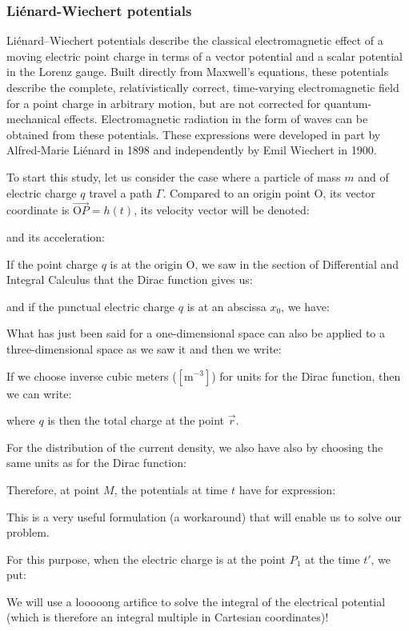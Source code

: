 	\subsubsection{Liénard-Wiechert potentials}\label{linear wiechard potentials}
	Liénard–Wiechert potentials describe the classical electromagnetic effect of a moving electric point charge in terms of a vector potential and a scalar potential in the Lorenz gauge. Built directly from Maxwell's equations, these potentials describe the complete, relativistically correct, time-varying electromagnetic field for a point charge in arbitrary motion, but are not corrected for quantum-mechanical effects. Electromagnetic radiation in the form of waves can be obtained from these potentials. These expressions were developed in part by Alfred-Marie Liénard in 1898 and independently by Emil Wiechert in 1900.
	
	To start this study, let us consider the case where a particle of mass $m$ and of electric charge $q$ travel a path $\Gamma$. Compared to an origin point O, its vector coordinate is $\overrightarrow{\text{O}P}=h(t)$, its velocity vector will be denoted:
	
	and its acceleration:
	
	If the point charge $q$ is at the origin O, we saw in the section of Differential and Integral Calculus that the Dirac function gives us:
	
	and if the punctual electric charge $q$ is at an abscissa $x_0$, we have:
	
	What has just been said for a one-dimensional space can also be applied to a three-dimensional space as we saw it and then we write:
	
	If we choose inverse cubic meters ($[\text{m}^{-3}]$) for units for the Dirac function, then we can write:
	
	where $q$ is then the total charge at the point $\vec{r}$.

	For the distribution of the current density, we also have also by choosing the same units as for the Dirac function:
	
	Therefore, at point $M$, the potentials at time $t$ have for expression:
	
	This is a very useful formulation (a workaround) that will enable us to solve our problem.

	For this purpose, when the electric charge is at the point $P_1$ at the time $t'$, we put:
	
	We will use a looooong artifice to solve the integral of the electrical potential (which is therefore an integral multiple in Cartesian coordinates)!

